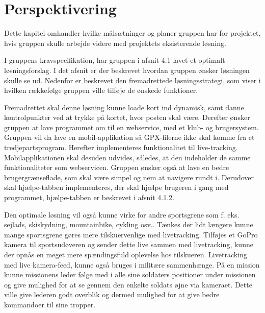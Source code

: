\chapter{Perspektivering}
Dette kapitel omhandler hvilke målsætninger og planer gruppen har for projektet, hvis gruppen skulle arbejde videre med projektets eksisterende løsning.

I gruppens kravspecifikation, har gruppen i afsnit 4.1 lavet et optimalt løsningsforslag. I det afsnit er der beskrevet hvordan gruppen ønsker løsningen skulle se ud. Nedenfor er beskrevet den fremadrettede løsningsstrategi, som viser i hvilken rækkefølge gruppen ville tilføje de ønskede funktioner.

Fremadrettet skal denne løsning kunne loade kort ind dynamisk, samt danne kontrolpunkter ved at trykke på kortet, hvor posten skal være. Derefter ønsker gruppen at lave programmet om til en webservice, med et klub- og brugersystem.
Gruppen vil da lave en mobil-applikation så GPX-filerne ikke skal komme fra et tredjepartsprogram. Herefter implementeres funktionalitet til live-tracking.  Mobilapplikationen skal desuden udvides, således, at den indeholder de samme funktionaliteter som webservicen.\newline
Gruppen ønsker også at lave en bedre brugergrænseflade, som skal være simpel og nem at navigere rundt i. Derudover skal hjælpe-tabben implementeres, der skal hjælpe brugeren i gang med programmet, hjælpe-tabben er beskrevet i afsnit 4.1.2. 

Den optimale løsning vil også kunne virke for andre sportsgrene som f. eks. sejlads, skiskydning, mountainbike, cykling osv..
Tænkes der lidt længere kunne mange sportsgrene gøres mere tilskuervenlige med livetracking. Tilføjes et GoPro kamera til sportsudøveren og sender dette live sammen med livetracking, kunne der opnås en meget mere spændingsfuld oplevelse hos tilskueren.
Livetracking med live kamera-feed, kunne også bruges i militære sammenhænge. På en mission kunne missionens leder følge med i alle sine soldaters positioner under missionen og give mulighed for at se gennem den enkelte soldats øjne via kameraet. Dette ville give lederen godt overblik og dermed mulighed for at give bedre kommandoer til sine tropper.
